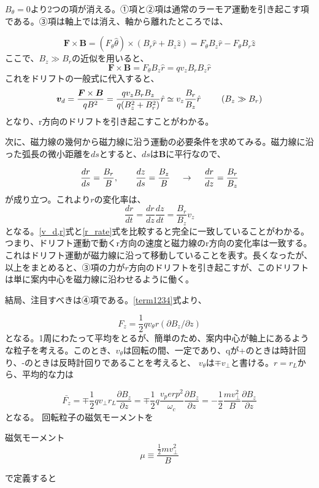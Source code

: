 \documentclass{ltjsarticle}
\numberwithin{equation}{section} %
\begin{document}
$B_\theta = 0$より2つの項が消える。➀項と➁項は通常のラーモア運動を引き起こす項である。➂項は軸上では消え、軸から離れたところでは、

\[
  \bm{F} \times \bm{B} = (F_\theta \hat{\theta}) \times (B_r \hat{r}+B_z \hat{z}) = F_\theta B_z \hat{r} - F_\theta B_r \hat{z}
\]
ここで、$B_z \gg B_r$の近似を用いると、
\[
 \bm{F} \times \bm{B} = F_\theta B_z \hat{r} = qv_zB_rB_z\hat{r}
\]
これをドリフトの一般式に代入すると、
\begin{equation}
  \bm{v}_{d} = \frac{\bm{F} \times \bm{B}}{qB^2} = \frac{qv_zB_rB_z}{q(B_z^2+B_r^2)}\hat{r} \simeq v_z \frac{B_r}{B_z}\hat{r} \hspace{2pc} (B_z \gg B_r) \label{v_d,r}
\end{equation}
となり、r方向のドリフトを引き起こすことがわかる。

次に、磁力線の幾何から磁力線に沿う運動の必要条件を求めてみる。磁力線に沿った弧長の微小距離を$ds$とすると、$ds$は$\bm{B}$に平行なので、

\[
 \frac{dr}{ds} = \frac{B_r}{B}, \qquad \frac{dz}{ds} = \frac{B_z}{B} \hspace{1pc} \to \hspace{1pc} \frac{dr}{dz} = \frac{B_r}{B_z} 
\]
が成り立つ。これより$r$の変化率は、
\begin{equation}
  \frac{dr}{dt} = \frac{dr}{dz}\frac{dz}{dt} = \frac{B_r}{B_z}v_z \label{r_rate}
\end{equation}
となる。\eqref{v_d,r}式と\eqref{r_rate}式を比較すると完全に一致していることがわかる。つまり、ドリフト運動で動くr方向の速度と磁力線のr方向の変化率は一致する。
これはドリフト運動が磁力線に沿って移動していることを表す。長くなったが、以上をまとめると、➂項の力が$r$方向のドリフトを引き起こすが、このドリフトは単に案内中心を磁力線に沿わせるように働く。

結局、注目すべきは➃項である。\eqref{term1234}式より、

\begin{equation}
  F_z = \frac{1}{2}qv_\theta r(\partial B_z/\partial z)
\end{equation}
となる。1周にわたって平均をとるが、簡単のため、案内中心が軸上にあるような粒子を考える。このとき、$v_\theta$は回転の間、一定であり、qが+のときは時計回り、-のときは反時計回りであることを考えると、
$v_\theta$は$\mp v_\perp$と書ける。$r=r_L$から、平均的な力は

\begin{equation}
  \bar{F_z} = \mp \frac{1}{2}qv_\perp r_L\frac{\partial B_z}{\partial z} = \mp \frac{1}{2}q\frac{v_perp ^2}{\omega_c}\frac{\partial B_z}{\partial z} = -\frac{1}{2}\frac{mv_\perp ^2}{B}\frac{\partial B_z}{\partial z}
\end{equation}
となる。
回転粒子の磁気モーメントを
\begin{eqbox}{磁気モーメント}
\begin{equation}
 \mu \equiv \dfrac{\frac{1}{2}mv_\perp ^2 }{B}  \label{df.mag_moment}
\end{equation}
\end{eqbox}
で定義すると
\end{document}
